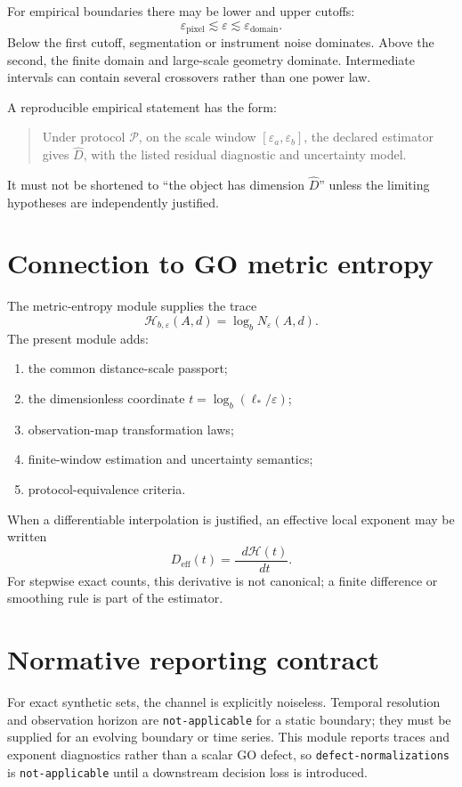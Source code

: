 \documentclass[11pt,a4paper]{article}
\theoremstyle{definition}
\theoremstyle{plain}
\theoremstyle{remark}
\newcommand{\Pcal}{\mathcal{P}}
\newcommand{\Hmet}{\mathscr{H}}
\newcommand{\dd}{\mathop{}\!d}
\begin{document}
For empirical boundaries there may be lower and upper cutoffs:
\[
\varepsilon_{\mathrm{pixel}}
\lesssim
\varepsilon
\lesssim
\varepsilon_{\mathrm{domain}}.
\]
Below the first cutoff, segmentation or instrument noise dominates.
Above the second, the finite domain and large-scale geometry dominate.
Intermediate intervals can contain several crossovers rather than one
power law.

A reproducible empirical statement has the form:
\begin{quote}
Under protocol $\Pcal$, on the scale window
$[\varepsilon_a,\varepsilon_b]$, the declared estimator gives
$\widehat D$, with the listed residual diagnostic and uncertainty model.
\end{quote}
It must not be shortened to ``the object has dimension $\widehat D$''
unless the limiting hypotheses are independently justified.

\section{Connection to GO metric entropy}

The metric-entropy module supplies the trace
\[
\Hmet_{b,\varepsilon}(A,d)
=
\log_bN_\varepsilon(A,d).
\]
The present module adds:
\begin{enumerate}[label=(\roman*)]
\item the common distance-scale passport;
\item the dimensionless coordinate
      $t=\log_b(\ell_*/\varepsilon)$;
\item observation-map transformation laws;
\item finite-window estimation and uncertainty semantics;
\item protocol-equivalence criteria.
\end{enumerate}

When a differentiable interpolation is justified, an effective local
exponent may be written
\[
D_{\mathrm{eff}}(t)
=
\frac{\dd \Hmet(t)}{\dd t}.
\]
For stepwise exact counts, this derivative is not canonical; a finite
difference or smoothing rule is part of the estimator.

\section{Normative reporting contract}

For exact synthetic sets, the channel is explicitly noiseless. Temporal
resolution and observation horizon are \texttt{not-applicable} for a
static boundary; they must be supplied for an evolving boundary or time
series. This module reports traces and exponent diagnostics rather than a
scalar GO defect, so \texttt{defect-normalizations} is
\texttt{not-applicable} until a downstream decision loss is introduced.
\end{document}
